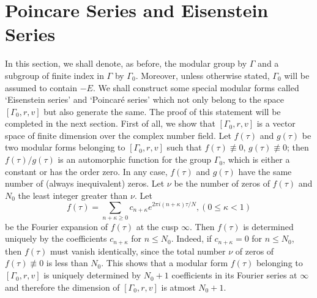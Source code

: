 \section{Poincare Series and Eisenstein Series}\label{chap3:sec2}

In this section, we shall denote, as before, the modular group by
$\Gamma$ and a subgroup of finite index in $\Gamma$ by
$\Gamma_0$. Moreover, unless otherwise stated, $\Gamma_0$ will be
assumed to contain $-E$. We shall construct some special modular forms
called `Eisenstein series' and `Poincar\'e series' which not only
belong to the space $[\Gamma_0, r, v]$ but also generate the same. The
proof of this statement will be completed in the next section. First
of all, we show that $[\Gamma_0, r, v]$ is a vector space of finite
dimension over the complex number field. Let $f(\tau)$ and $g(\tau)$
be two modular forms belonging to $[\Gamma_0, r, v]$ such that
$f(\tau)\not\equiv 0$, $g(\tau)\not\equiv 0$; then $f(\tau)/g(\tau)$
is an automorphic function for the group $\Gamma_0$, which is either a
constant or has the order zero. In any case, $f(\tau)$ and $g(\tau)$
have the same number of (always inequivalent) zeros. Let $\nu$ be the
number of zeros of $f(\tau)$ and $N_0$ the least integer greater than
$\nu$. Let
$$
f(\tau) = \sum_{n+\kappa \geq 0} c_{n+\kappa} e^{2\pi
  i(n+\kappa)\tau/N}, (0\leq \kappa <1)
$$
be the Fourier expansion of $f(\tau)$ at the cusp $\infty$. Then
$f(\tau)$ is determined uniquely by the coefficients $c_{n+\kappa}$
for $n \leq N_0$. Indeed, if $c_{n+\kappa}=0$ for $n\leq N_0$, then
$f(\tau)$ must vanish identically, since the total number $\nu$ of
zeros of $f(\tau)\not\equiv 0$ is less than $N_0$. This shows that a
modular form $f(\tau)$ belonging to $[\Gamma_0, r, v]$ is uniquely
determined by $N_0+1$ coefficients in its Fourier series at $\infty$
and therefore the dimension of $[\Gamma_0, r, v]$ is atmost $N_0+1$. 

